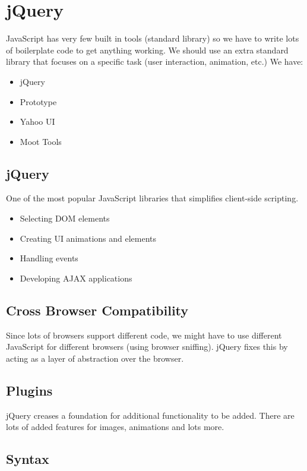 \section{jQuery}\label{sec:jquery}

JavaScript has very few built in tools (standard library) so we have to write lots of boilerplate code to get anything working.
We should use an extra standard library that focuses on a specific task (user interaction, animation, etc.)
We have:
\begin{itemize}
	\item jQuery
	\item Prototype
	\item Yahoo UI
	\item Moot Tools
\end{itemize}

\subsection{jQuery}\label{sub:jquery}

One of the most popular JavaScript libraries that simplifies client-side scripting.
\begin{itemize}
	\item Selecting DOM elements
	\item Creating UI animations and elements
	\item Handling events
	\item Developing AJAX applications
\end{itemize}

\subsection{Cross Browser Compatibility}\label{sub:cross_browser_compatibility}

Since lots of browsers support different code, we might have to use different JavaScript for different browsers (using browser sniffing).
jQuery fixes this by acting as a layer of abstraction over the browser.

\subsection{Plugins}\label{sub:plugins}

jQuery creases a foundation for additional functionality to be added.
There are lots of added features for images, animations and lots more.

\subsection{Syntax}\label{sub:syntax}


